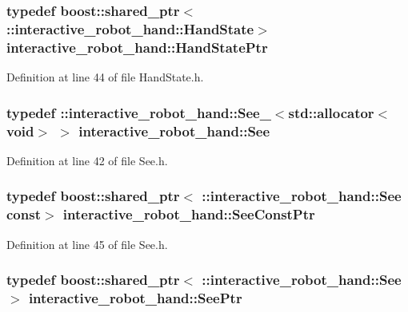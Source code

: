 \subsubsection[{Hand\-State\-Ptr}]{\setlength{\rightskip}{0pt plus 5cm}typedef boost\-::shared\-\_\-ptr$<$ \-::{\bf interactive\-\_\-robot\-\_\-hand\-::\-Hand\-State}$>$ {\bf interactive\-\_\-robot\-\_\-hand\-::\-Hand\-State\-Ptr}}\label{namespaceinteractive__robot__hand_ad0760b1a1a24696aecc0b60e08c8eb5b}


Definition at line 44 of file Hand\-State.\-h.

\subsubsection[{See}]{\setlength{\rightskip}{0pt plus 5cm}typedef \-::{\bf interactive\-\_\-robot\-\_\-hand\-::\-See\-\_\-}$<$std\-::allocator$<$void$>$ $>$ {\bf interactive\-\_\-robot\-\_\-hand\-::\-See}}\label{namespaceinteractive__robot__hand_a69999dbec74bedbe80d8c4ec7314fbec}


Definition at line 42 of file See.\-h.

\subsubsection[{See\-Const\-Ptr}]{\setlength{\rightskip}{0pt plus 5cm}typedef boost\-::shared\-\_\-ptr$<$ \-::{\bf interactive\-\_\-robot\-\_\-hand\-::\-See} const$>$ {\bf interactive\-\_\-robot\-\_\-hand\-::\-See\-Const\-Ptr}}\label{namespaceinteractive__robot__hand_ae162aaf69cde2861bea4a2a7e3abd23f}


Definition at line 45 of file See.\-h.

\subsubsection[{See\-Ptr}]{\setlength{\rightskip}{0pt plus 5cm}typedef boost\-::shared\-\_\-ptr$<$ \-::{\bf interactive\-\_\-robot\-\_\-hand\-::\-See}$>$ {\bf interactive\-\_\-robot\-\_\-hand\-::\-See\-Ptr}}\label{namespaceinteractive__robot__hand_a36260df7f3e4fa16d9f9b22d2d6b475b}


